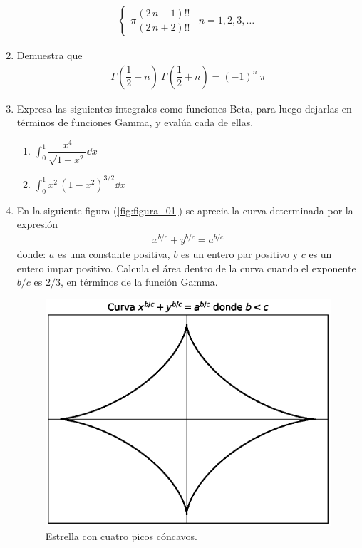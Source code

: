\begin{enumerate}
\begin{align*}
\begin{cases}
\pi \dfrac{(2 \, n - 1)!!}{(2 \, n + 2)!!} & n = 1,2,3,\ldots  \end{cases}
\end{align*} 
\item Demuestra que 
\begin{align*}
\Gamma \left( \dfrac{1}{2} - n \right) \: \Gamma \left( \dfrac{1}{2} + n \right) = (-1)^{n} \: \pi
\end{align*}
\newpage
\item Expresa las siguientes integrales como funciones Beta, para luego dejarlas en términos de funciones Gamma, y evalúa cada de ellas.
\begin{enumerate}
\item $\displaystyle \int_{0}^{1} \dfrac{x^{4}}{\sqrt{1 -x^{2}}} \dd{x}$
\item $\displaystyle \int_{0}^{1} x^{2} \, (1 - x^{2})^{3/2} \dd{x}$
\end{enumerate} 
\item En la siguiente figura (\ref{fig:figura_01}) se aprecia la curva determinada por la expresión
\begin{align*}
x^{b/c} + y^{b/c} = a^{b/c}
\end{align*}
donde: $a$ es una constante positiva, $b$ es un entero par positivo y $c$ es un entero impar positivo. Calcula el área dentro de la curva cuando el exponente $b/c$ es $2/3$, en términos de la función Gamma.
\begin{figure}[!ht]
    \centering
    \includegraphics[scale=0.8]{Imagenes/plot_curva_estrella_01.eps}
    \caption{Estrella con cuatro picos cóncavos.}

\end{figure}
\end{enumerate}
